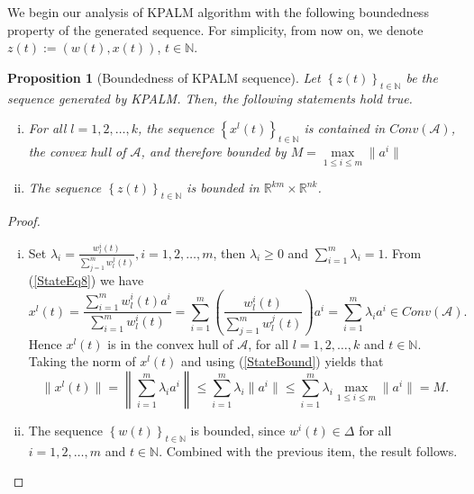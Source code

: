\documentclass[11pt]{article}
\numberwithin{equation}{section}
\newtheorem{proposition}{Proposition}[section]
\begin{document}
We begin our analysis of KPALM algorithm with the following boundedness property of the generated sequence. For simplicity, from now on, we denote $z(t):=\left( w(t),x(t) \right)$, $t \in \mathbb{N}$.
\begin{proposition}[Boundedness of KPALM sequence]
Let $\left\lbrace z(t) \right\rbrace_{t \in \mathbb{N}}$ be the sequence generated by KPALM. Then, the following statements hold true.
\begin{enumerate}[(i)]
	\item For all $l=1, 2, \ldots ,k$, the sequence $\left\lbrace x^l(t) \right\rbrace_{t \in \mathbb{N}}$ is contained in $Conv(\mathcal{A})$, the convex hull of $\mathcal{A}$, and therefore bounded by $M = \max\limits_{1 \leq i \leq m} \| a^i \|$
	\item The sequence $\left\lbrace z(t) \right\rbrace_{t \in \mathbb{N}}$ is bounded in $\mathbb{R}^{km} \times \mathbb{R}^{nk}$.
\end{enumerate}
\end{proposition}

\begin{proof}
\begin{enumerate}[(i)]
	\item  Set $\lambda_i = \frac{ w^i_l(t)}{\sum_{j=1}^{m} w^j_l(t)}, i=1, 2, \ldots ,m$, then $\lambda_i \geq 0$ and $\sum\limits_{i=1}^{m} \lambda_i = 1$. From (\ref{StateEq8}) we have
	\begin{equation}
		x^l(t) = \frac{\sum_{i=1}^{m} w^i_l(t) a^i}{\sum_{i=1}^{m} w^i_l(t)} 
		= \sum_{i=1}^{m} \left( \frac{ w^i_l(t)}{\sum_{j=1}^{m} w^j_l(t)} \right) a^i 
		= \sum\limits_{i=1}^{m} \lambda_i a^i \in Conv(\mathcal{A}). \label{StateBound}
	\end{equation}
	Hence $x^l(t)$ is in the convex hull of $\mathcal{A}$, for all $l = 1, 2, \ldots, k$ and $t \in \mathbb{N}$. Taking the norm of $x^l(t)$ and using (\ref{StateBound}) yields that
	\begin{equation*}
		\| x^l(t) \| = \left\lVert \sum_{i=1}^{m} \lambda_i a^i \right\lVert
		\leq \sum_{i=1}^{m} \lambda_i \| a^i \|
		\leq \sum_{i=1}^{m} \lambda_i \max\limits_{1 \leq i \leq m} \| a^i \| = M .
	\end{equation*}
	\item The sequence $\left\lbrace w(t) \right\rbrace_{t \in \mathbb{N}}$ is bounded, since $w^i(t) \in \Delta$ for all $i=1, 2, \ldots ,m$ and $t \in \mathbb{N}$. Combined with the previous item, the result follows.
\end{enumerate} 
\end{proof}
\end{document}

